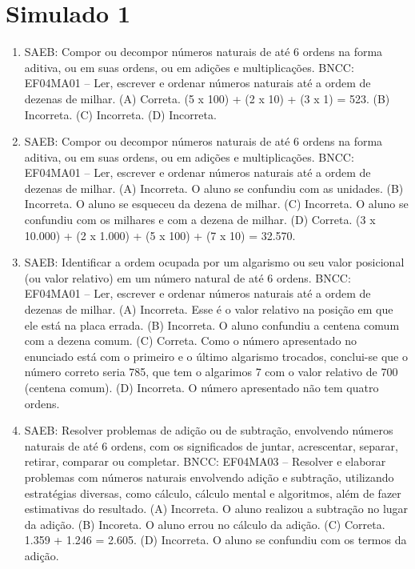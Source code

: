 \section*{Simulado 1}

\begin{enumerate}
\item
SAEB: Compor ou decompor números naturais de até 6 ordens na forma aditiva, ou
em suas ordens, ou em adições e multiplicações.
BNCC: EF04MA01 -- Ler, escrever e ordenar números naturais até a ordem de dezenas de milhar.
(A) Correta. (5 x 100) + (2 x 10) + (3 x 1) = 523.
(B) Incorreta. 
(C) Incorreta. 
(D) Incorreta. 

\item
SAEB: Compor ou decompor números naturais de até 6 ordens na forma aditiva, ou
em suas ordens, ou em adições e multiplicações.
BNCC: EF04MA01 -- Ler, escrever e ordenar números naturais até a ordem de dezenas de milhar.
(A) Incorreta. O aluno se confundiu com as unidades.
(B) Incorreta. O aluno se esqueceu da dezena de milhar.
(C) Incorreta. O aluno se confundiu com os milhares e com a dezena de milhar.
(D) Correta. (3 x 10.000) + (2 x 1.000) + (5 x 100) + (7 x 10) = 32.570.

\item
SAEB: Identificar a ordem ocupada por um algarismo ou seu valor posicional (ou
valor relativo) em um número natural de até 6 ordens.
BNCC: EF04MA01 -- Ler, escrever e ordenar números naturais até a ordem de dezenas de milhar.
(A) Incorreta. Esse é o valor relativo na posição em que ele está na placa errada.
(B) Incorreta. O aluno confundiu a centena comum com a dezena comum.
(C) Correta. Como o número apresentado no enunciado está com o primeiro e o último
algarismo trocados, conclui-se que o número correto seria 785, que tem o algarimos 7 com o valor relativo de 700 (centena comum).
(D) Incorreta. O número apresentado não tem quatro ordens.

\item
SAEB: Resolver problemas de adição ou de subtração, envolvendo números
naturais de até 6 ordens, com os significados de juntar, acrescentar,
separar, retirar, comparar ou completar.
BNCC: EF04MA03 -- Resolver e elaborar problemas com números naturais envolvendo adição e subtração,
utilizando estratégias diversas, como cálculo, cálculo mental e algoritmos, além de fazer estimativas
do resultado.
(A) Incorreta. O aluno realizou a subtração no lugar da adição.
(B) Incoreta. O aluno errou no cálculo da adição.
(C) Correta. 1.359 + 1.246 = 2.605.
(D) Incorreta. O aluno se confundiu com os termos da adição.


\end{enumerate}
